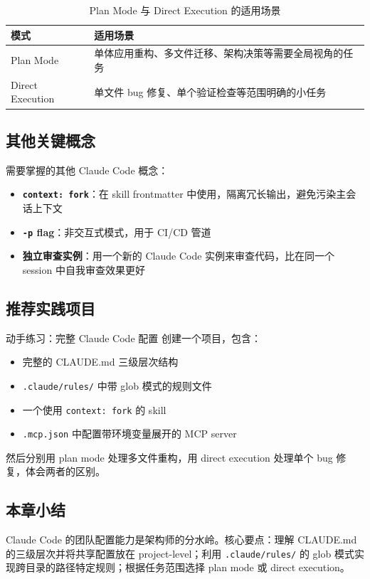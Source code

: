 \begin{table}[H]
\centering
\begin{tabular}{lp{9cm}}
\toprule
\textbf{模式} & \textbf{适用场景} \\
\midrule
Plan Mode & 单体应用重构、多文件迁移、架构决策等需要全局视角的任务 \\
Direct Execution & 单文件 bug 修复、单个验证检查等范围明确的小任务 \\
\bottomrule
\end{tabular}
\caption{Plan Mode 与 Direct Execution 的适用场景}
\end{table}

\subsection{其他关键概念}

需要掌握的其他 Claude Code 概念：
\begin{itemize}[leftmargin=1.5em]
    \item \textbf{\texttt{context: fork}}：在 skill frontmatter 中使用，隔离冗长输出，避免污染主会话上下文
    \item \textbf{\texttt{-p} flag}：非交互式模式，用于 CI/CD 管道
    \item \textbf{独立审查实例}：用一个新的 Claude Code 实例来审查代码，比在同一个 session 中自我审查效果更好
\end{itemize}

\subsection{推荐实践项目}

\begin{knowledgebox}{动手练习：完整 Claude Code 配置}
创建一个项目，包含：
\begin{itemize}[leftmargin=1.5em]
    \item 完整的 CLAUDE.md 三级层次结构
    \item \texttt{.claude/rules/} 中带 glob 模式的规则文件
    \item 一个使用 \texttt{context: fork} 的 skill
    \item \texttt{.mcp.json} 中配置带环境变量展开的 MCP server
\end{itemize}
然后分别用 plan mode 处理多文件重构，用 direct execution 处理单个 bug 修复，体会两者的区别。
\end{knowledgebox}

\subsection{本章小结}

Claude Code 的团队配置能力是架构师的分水岭。核心要点：理解 CLAUDE.md 的三级层次并将共享配置放在 project-level；利用 \texttt{.claude/rules/} 的 glob 模式实现跨目录的路径特定规则；根据任务范围选择 plan mode 或 direct execution。

